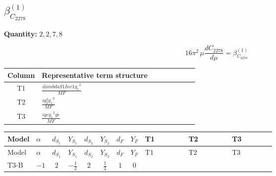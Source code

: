 \documentclass[8pt]{article}
\begin{document}
\begin{landscape}
\section*{$\beta_{C_{2278}}^{(1)}$}
\noindent\textbf{Quantity: }$\mathrm{2,2,7,8}$\par\smallskip
\[16\pi^2\,\mu\frac{d C_{2278}}{d\mu}=\beta_{C_{2278}}^{(1)}\]
\begin{center}
\begin{tabular}{@{}c >{\raggedright\arraybackslash}p{0.82\linewidth}@{}}
\toprule
Column & Representative term structure \\
\midrule
T1 & \(\displaystyle \frac{i lambdaS1Inv1 \overline{y_{1}}^{2}}{MF}\) \\
\midrule
T2 & \(\displaystyle \frac{i g_{2}^{2} \overline{y_{1}}^{2}}{MF}\) \\
\midrule
T3 & \(\displaystyle \frac{i ye \overline{y_{1}}^{2} \overline{ye}}{MF}\) \\
\midrule
\bottomrule
\end{tabular}
\end{center}
\smallskip
\tiny
\begin{longtable}{@{}llcccccc >{\raggedright\arraybackslash}p{0.21\linewidth} >{\raggedright\arraybackslash}p{0.21\linewidth} >{\raggedright\arraybackslash}p{0.21\linewidth}@{}}
\toprule
Model & $\alpha$ & $d_{S_1}$ & $Y_{S_1}$ & $d_{S_2}$ & $Y_{S_2}$ & $d_F$ & $Y_F$ & T1 & T2 & T3 \\
\midrule
\endfirsthead
\toprule
Model & $\alpha$ & $d_{S_1}$ & $Y_{S_1}$ & $d_{S_2}$ & $Y_{S_2}$ & $d_F$ & $Y_F$ & T1 & T2 & T3 \\
\midrule
\endhead
T3-B & $-1$ & $2$ & $-\frac{1}{2}$ & $2$ & $\frac{1}{2}$ & $1$ & $0$ & \scriptsize\adjustbox{max width=\linewidth}{$\begin{gathered} \frac{i lambdaS1Inv1 \overline{y_{1}}^{2}}{2 MF}\end{gathered}$} & \scriptsize\adjustbox{max width=\linewidth}{$\begin{gathered} \frac{3 i g_{2}^{2} \overline{y_{1}}^{2}}{4 MF}\end{gathered}$} & \scriptsize\adjustbox{max width=\linewidth}{$\begin{gathered} - \frac{i ye \overline{y_{1}}^{2} \overline{ye}}{4 MF}\end{gathered}$} \\
\midrule
\bottomrule
\end{longtable}
\clearpage

\end{landscape}
\end{document}
